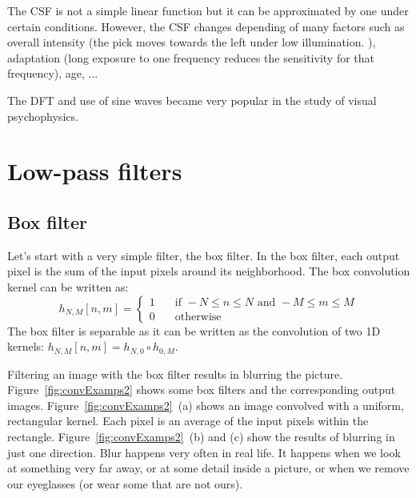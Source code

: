 The CSF is not a simple linear function but it can be approximated by one under certain conditions. However, the CSF changes depending of many factors such as overall intensity (the pick moves towards the left under low illumination. ), adaptation (long exposure to one frequency reduces the sensitivity for that frequency), age, ...

The DFT and use of sine waves became very popular in the study of visual psychophysics.

%
%
%
%


\section{Low-pass filters}


\subsection{Box filter}

Let's start with a very simple filter, the box filter.  In the box filter, each output pixel is the sum of the input pixels around its neighborhood. The box convolution kernel can be written as:
\begin{equation}
	h_{N,M} \left[n,m \right] =
	\begin{cases}
		1 & \quad \text{if } -N \leq n \leq N  \text{~and~}  -M \leq m \leq M \\
		0 & \quad \text{otherwise }
	\end{cases}
\end{equation}
The box filter is separable as it can be written as the convolution of two 1D kernels: $h_{N,M} \left[n,m \right]  = h_{N,0} \circ h_{0,M}$.

Filtering an image with the box filter results in blurring the picture. Figure~\ref{fig:convExamps2} shows some box filters and the corresponding output images. Figure~\ref{fig:convExamps2}~(a) shows an image convolved with a uniform, rectangular kernel. Each pixel is an average of the input pixels within the rectangle. Figure~\ref{fig:convExamps2}~(b) and (c)  show the results of blurring in just one direction. Blur happens very often in real life. It happens when we look at something very far away, or at some detail inside a picture, or when we remove our eyeglasses (or wear some that are not ours).

